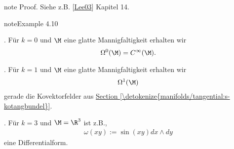 \documentclass[letterpaper,10pt,english]{jupyterBook}
\begin{document}
\begin{sphinxadmonition}{note}
\sphinxAtStartPar
Proof. Siehe z.B. {[}\hyperlink{cite.references:id15}{Lee03}{]} Kapitel 14.
\end{sphinxadmonition}
\label{manifolds/diffformen:example-4}
\begin{sphinxadmonition}{note}{Example 4.10}



. Für \(k=0\) und \(\M\) eine glatte Mannigfaltigkeit erhalten wir
\begin{equation*}
\begin{split}\Omega^0(\M) = C^\infty(\M).\end{split}
\end{equation*}


. Für \(k=1\) und \(\M\) eine glatte Mannigfaltigkeit erhalten wir
\begin{equation*}
\begin{split}\Omega^1(\M)\end{split}
\end{equation*}
\sphinxAtStartPar
gerade die Kovektorfelder aus \hyperref[\detokenize{manifolds/tangential:s-kotangbundel}]{Section \ref{\detokenize{manifolds/tangential:s-kotangbundel}}}.



. Für \(k=3\) und \(\M=\R^3\) ist z.B.,
\begin{equation*}
\begin{split}\omega(xy) := \sin(xy) dx\wedge dy\end{split}
\end{equation*}
\sphinxAtStartPar
eine Differentialform.
\end{sphinxadmonition}
\end{document}
